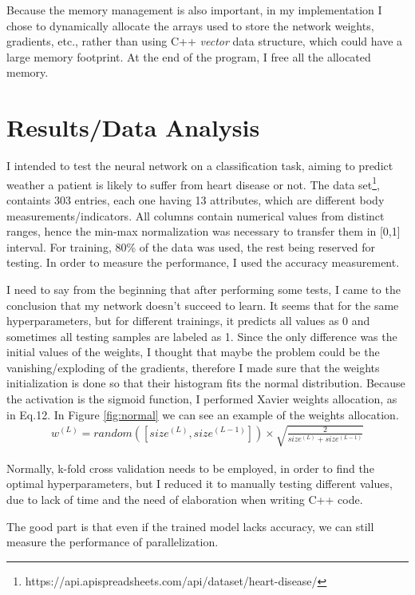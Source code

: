 \documentclass{article}
\begin{document}
	Because the memory management is also important, in my implementation I chose to dynamically allocate the arrays used to store the network weights, gradients, etc., rather than using C++ \textit{vector} data structure, which could have a large memory footprint. At the end of the program, I free all the allocated memory.
	
	\section{Results/Data Analysis}
	
	I intended to test the neural network on a classification task, aiming to predict weather a patient is likely to suffer from heart disease or not. The data set\footnote{https://api.apispreadsheets.com/api/dataset/heart-disease/}, 
	containts 303 entries, each one having 13 attributes, which are different body measurements/indicators.
	All columns contain numerical values from distinct ranges, hence the min-max normalization was necessary to transfer them in [0,1] interval.
	For training, 80\% of the data was used, the rest being reserved for testing. In order to measure the performance, I used the accuracy measurement.
	
	
	I need to say from the beginning that after performing some tests, I came to the conclusion that my network doesn't succeed to learn. It seems that for the same hyperparameters, but for different trainings, it predicts all values as 0 and sometimes all testing samples are labeled as 1.
	Since the only difference was the initial values of the weights, I thought that maybe the problem could be the vanishing/exploding of the gradients, therefore I made sure that the weights initialization is done so that their histogram fits the normal distribution. Because the activation is the sigmoid function, I performed Xavier weights allocation, as in Eq.12. In Figure \ref{fig:normal} we can see an example of the weights allocation.
	\begin{eqnarray}
		w^{(L)} = random([size^{(L)}, size^{(L-1)}]) \times \sqrt{\frac{2}{size^(L)+size^{(L-1)}}}
	\end{eqnarray}
	
	Normally, k-fold cross validation needs to be employed, in order to find the optimal hyperparameters, but I reduced it to manually testing different values, due to lack of time and the need of elaboration when writing C++ code.
	
	The good part is that even if the trained model lacks accuracy, we can still measure the performance of parallelization.
	
\end{document}
